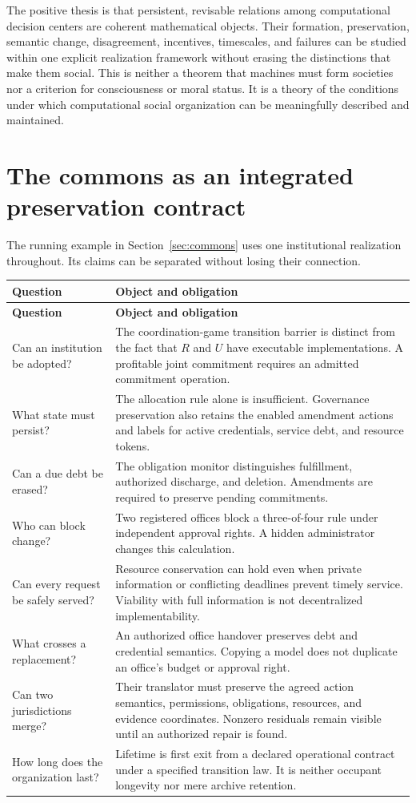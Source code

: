 \documentclass[11pt,letterpaper]{article}
\theoremstyle{plain}
\theoremstyle{definition}
\theoremstyle{remark}
\begin{document}
The positive thesis is that persistent, revisable relations among computational decision centers are coherent mathematical objects. Their formation, preservation, semantic change, disagreement, incentives, timescales, and failures can be studied within one explicit realization framework without erasing the distinctions that make them social. This is neither a theorem that machines must form societies nor a criterion for consciousness or moral status. It is a theory of the conditions under which computational social organization can be meaningfully described and maintained.
\FloatBarrier

\appendix
\section{The commons as an integrated preservation contract}\label{app:allocation}
The running example in Section~\ref{sec:commons} uses one institutional realization throughout. Its claims can be separated without losing their connection.
\begin{longtable}{@{}P{.25\linewidth}P{.69\linewidth}@{}}
\toprule
\textbf{Question} & \textbf{Object and obligation}\\\midrule
\endfirsthead
\toprule\textbf{Question}&\textbf{Object and obligation}\\\midrule\endhead
Can an institution be adopted? & The coordination-game transition barrier is distinct from the fact that $R$ and $U$ have executable implementations. A profitable joint commitment requires an admitted commitment operation.\\[.5em]
What state must persist? & The allocation rule alone is insufficient. Governance preservation also retains the enabled amendment actions and labels for active credentials, service debt, and resource tokens.\\[.5em]
Can a due debt be erased? & The obligation monitor distinguishes fulfillment, authorized discharge, and deletion. Amendments are required to preserve pending commitments.\\[.5em]
Who can block change? & Two registered offices block a three-of-four rule under independent approval rights. A hidden administrator changes this calculation.\\[.5em]
Can every request be safely served? & Resource conservation can hold even when private information or conflicting deadlines prevent timely service. Viability with full information is not decentralized implementability.\\[.5em]
What crosses a replacement? & An authorized office handover preserves debt and credential semantics. Copying a model does not duplicate an office's budget or approval right.\\[.5em]
Can two jurisdictions merge? & Their translator must preserve the agreed action semantics, permissions, obligations, resources, and evidence coordinates. Nonzero residuals remain visible until an authorized repair is found.\\[.5em]
How long does the organization last? & Lifetime is first exit from a declared operational contract under a specified transition law. It is neither occupant longevity nor mere archive retention.\\
\bottomrule
\end{longtable}
\end{document}
